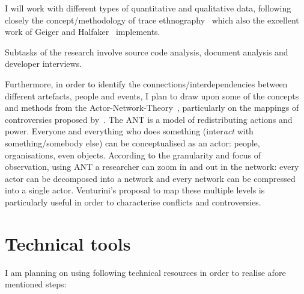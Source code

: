 \documentclass[pdftex,a4paper,11pt]{scrartcl}
\begin{document}
I will work with different types of quantitative and qualitative data, following closely the concept/methodology of trace ethnography~\cite{GeiRib2011} which also the excellent work of Geiger and Halfaker~\cite{GeiHal2017} implements.

Subtasks of the research involve source code analysis, document analysis and developer interviews.

Furthermore, in order to identify the connections/interdependencies between different artefacts, people and events, I plan to draw upon some of the concepts and methods from the Actor-Network-Theory~\cite{Latour2010}, particularly on the mappings of controversies proposed by~\cite{Venturini2010a}.
The ANT is a model of redistributing actions and power.
Everyone and everything who does something (inter\emph{act} with something/somebody else) can be conceptualised as an actor: people, organisations, even objects.
According to the granularity and focus of observation, using ANT a researcher can zoom in and out in the network: every actor can be decomposed into a network and every network can be compressed into a single actor.
Venturini's proposal to map these multiple levels is particularly useful in order to characterise conflicts and controversies.

\section{Technical tools}

I am planning on using following technical resources in order to realise afore mentioned steps:
\end{document}
